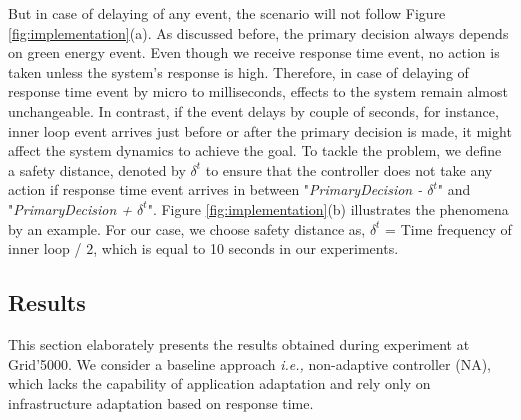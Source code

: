 But in case of delaying of any event, the scenario will not follow Figure \ref{fig:implementation}(a). As discussed before, the primary decision always depends on green energy event. Even though we receive response time event, no action is taken unless the system's response is high. Therefore, in case of delaying of response time event by micro to milliseconds, effects to the system remain almost unchangeable. In contrast, if the event delays by couple of seconds, for instance, inner loop event arrives just before or after the primary decision is made, it might affect the system dynamics to achieve the goal. To tackle the problem, we define a safety distance, denoted by $\delta^t$ to ensure that the controller does not take any action if response time event arrives in between "\textit{PrimaryDecision - $\delta^t$}" and "\textit{PrimaryDecision + $\delta^t$}". Figure \ref{fig:implementation}(b) illustrates the phenomena by an example. For our case, we choose safety distance as, $\delta^t$ = Time frequency of inner loop / $2$, which is equal to 10 seconds in our experiments.



\subsection{Results}

This section elaborately presents the results obtained during experiment at Grid'5000. We consider a baseline approach \emph{i.e.,} non-adaptive controller (NA), which lacks the capability of application adaptation and rely only on infrastructure adaptation based on response time.


